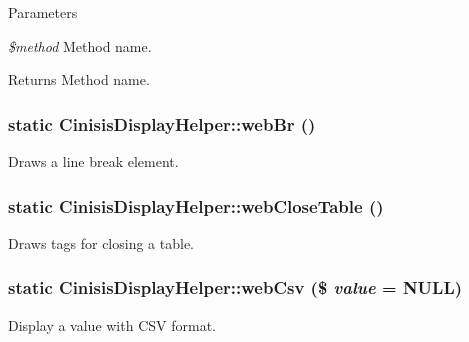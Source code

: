 \begin{DoxyParams}{Parameters}
\item[{\em \$method}]Method name.\end{DoxyParams}
\begin{DoxyReturn}{Returns}
Method name. 
\end{DoxyReturn}
\hypertarget{classCinisisDisplayHelper_a9c8b637e47e4263901baf4c5f2064d8d}{
\subsubsection[{webBr}]{\setlength{\rightskip}{0pt plus 5cm}static CinisisDisplayHelper::webBr ()}}
\label{classCinisisDisplayHelper_a9c8b637e47e4263901baf4c5f2064d8d}
Draws a line break element. \hypertarget{classCinisisDisplayHelper_ab4e55ec58b59bc8b2af32b93cdf0d7c1}{
\subsubsection[{webCloseTable}]{\setlength{\rightskip}{0pt plus 5cm}static CinisisDisplayHelper::webCloseTable ()}}
\label{classCinisisDisplayHelper_ab4e55ec58b59bc8b2af32b93cdf0d7c1}
Draws tags for closing a table. \hypertarget{classCinisisDisplayHelper_a0155226dc341e71cf2d32a7611a6402b}{
\subsubsection[{webCsv}]{\setlength{\rightskip}{0pt plus 5cm}static CinisisDisplayHelper::webCsv (\$ {\em value} = {\ttfamily NULL})}}
\label{classCinisisDisplayHelper_a0155226dc341e71cf2d32a7611a6402b}
Display a value with CSV format.


